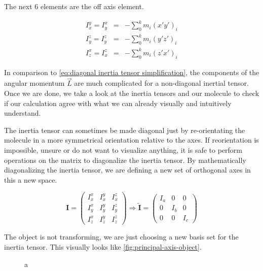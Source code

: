 \documentclass[11pt,a4paper]{book}
\newcommand{\imginput}[1]{} %
\begin{document}
			\noindent
			The next 6 elements are the off axis element.
			
			\begin{eqnarray}
				\label{eq:I_x^y}
					I_x^y = I_y^x &=&-\sum_0^k{m_i(x'y')_i}\\
				\label{eq:I_y^z}
					I_{y}^{z} = I_{y}^{z} & = &-\sum_0^k{m_i(y'z')_i}\\
				\label{eq:I_z^x}
					I_{z}^{x} = I_{x}^{z} & = &-\sum_0^k{m_i(z'x')_i}
			\end{eqnarray}
			
			In comparison to \autoref{eq:diagonal inertia tensor simplification}, the components of the angular momentum $\vec{L}$ are much complicated for a non-diagonal inertial tensor. Once we are done, we take a look at the inertia tensors and our molecule to check if our calculation agree with what we can already visually and intuitively understand.
			
			The inertia tensor can sometimes be made diagonal just by re-orientating the molecule in a more symmetrical orientation relative to the axes. If reorientation is impossible, unsure or do not want to visualize anything, it is safe to perform operations on the matrix to diagonalize the inertia tensor. By mathematically diagonalizing the inertia tensor, we are defining a new set of orthogonal axes in this a new space. 	
						
			\begin{equation}
				\label{eq:Inertia tensor}
				\textbf{I} =
				\begin{pmatrix}
					I_x^x & I_x^y & I_x^z \\
					I_y^x & I_y^y & I_y^z \\
					I_z^x & I_z^y & I_z^z
				\end{pmatrix}
				\Longrightarrow
				\tilde{\textbf{I}} =
				\begin{pmatrix}
					I_{a} & 0 & 0 \\
					0 & I_{b} & 0 \\
					0 & 0 & I_{c}
				\end{pmatrix} 
			\end{equation}	
			
			The object is not transforming, we are just choosing a new basis set for the inertia tensor. This visually looks like \autoref{fig:principal-axis-object}.
			
			\begin{figure} [!ht]
				\centering
				\large
				\def\svgwidth{\columnwidth}
				\resizebox{16cm}{!}{\imginput{images/principal-axis-object.pdf_tex}}
				\caption{a}
				\label{fig:principal-axis-object}
			\end{figure}
			
\end{document}
